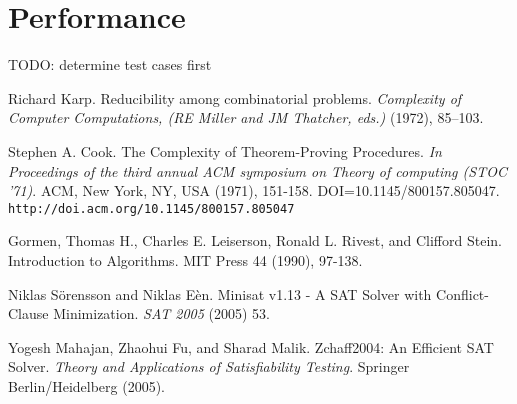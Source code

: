 \documentclass[paper=a4, fontsize=11pt]{scrartcl} %
\begin{document}
\section{Performance}
{\color{red} TODO}: determine test cases first


\begin{thebibliography}{9}

 Richard Karp. Reducibility among combinatorial problems. \emph{Complexity of Computer Computations, (RE Miller and JM Thatcher, eds.)} (1972), 85–103.

 Stephen A. Cook. The Complexity of Theorem-Proving Procedures. \emph{In Proceedings of the third annual ACM symposium on Theory of computing (STOC '71)}. ACM, New York, NY, USA (1971), 151-158. DOI=10.1145/800157.805047. {\tt http://doi.acm.org/10.1145/800157.805047}

 Gormen, Thomas H., Charles E. Leiserson, Ronald L. Rivest, and Clifford Stein. Introduction to Algorithms. MIT Press 44 (1990), 97-138.

 Niklas S\"{o}rensson and Niklas E\`{e}n. Minisat v1.13 - A SAT Solver with Conflict-Clause Minimization. \emph{SAT 2005} (2005) 53.

 Yogesh Mahajan, Zhaohui Fu, and Sharad Malik. Zchaff2004: An Efficient SAT Solver. \emph{Theory and Applications of Satisfiability Testing}. Springer Berlin/Heidelberg (2005).

\end{thebibliography}
\end{document}
